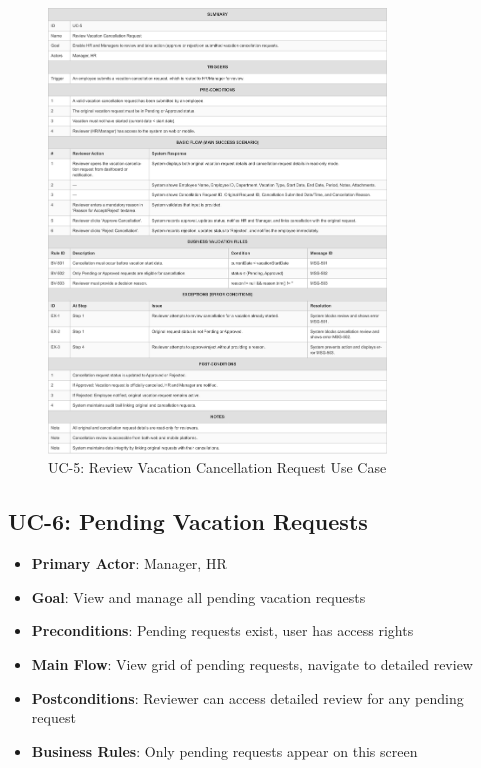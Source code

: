 \documentclass[12pt,a4paper]{article}
\begin{document}
\begin{figure}[H]
\centering
\includegraphics[width=0.8\textwidth]{Use-Cases/UC-5-Review-Vacation-Cancellation-Request/UC-5-Review-Vacation-Cancellation-Request-1.png}
\caption{UC-5: Review Vacation Cancellation Request Use Case}
\label{fig:uc5}
\end{figure}

\subsection{UC-6: Pending Vacation Requests}
\begin{itemize}
    \item \textbf{Primary Actor}: Manager, HR
    \item \textbf{Goal}: View and manage all pending vacation requests
    \item \textbf{Preconditions}: Pending requests exist, user has access rights
    \item \textbf{Main Flow}: View grid of pending requests, navigate to detailed review
    \item \textbf{Postconditions}: Reviewer can access detailed review for any pending request
    \item \textbf{Business Rules}: Only pending requests appear on this screen
\end{itemize}
\end{document}
